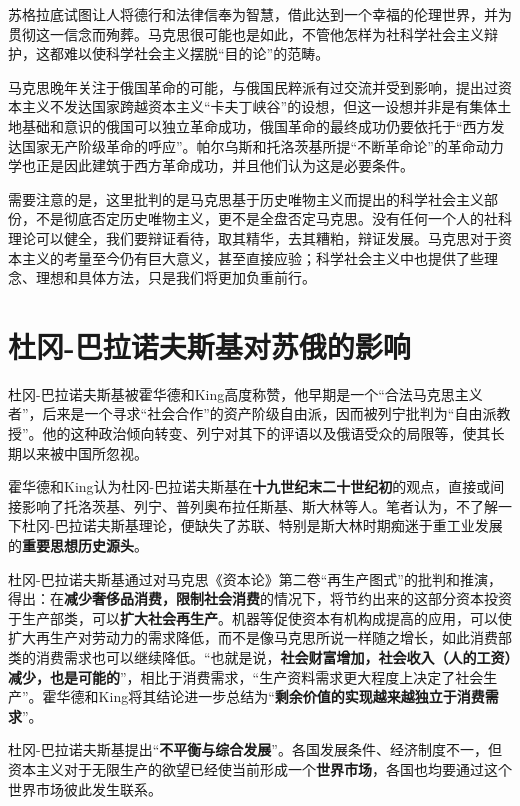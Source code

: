 苏格拉底试图让人将德行和法律信奉为智慧，借此达到一个幸福的伦理世界，并为贯彻这一信念而殉葬。马克思很可能也是如此，不管他怎样为社科学社会主义辩护，这都难以使科学社会主义摆脱“目的论”的范畴。

马克思晚年关注于俄国革命的可能，与俄国民粹派有过交流并受到影响，提出过资本主义不发达国家跨越资本主义“卡夫丁峡谷”的设想，但这一设想并非是有集体土地基础和意识的俄国可以独立革命成功，俄国革命的最终成功仍要依托于“西方发达国家无产阶级革命的呼应”。\cite{mamincui}帕尔乌斯和托洛茨基所提“不断革命论”的革命动力学也正是因此建筑于西方革命成功，并且他们认为这是必要条件。

需要注意的是，这里批判的是马克思基于历史唯物主义而提出的科学社会主义部份，不是彻底否定历史唯物主义，更不是全盘否定马克思。没有任何一个人的社科理论可以健全，我们要辩证看待，取其精华，去其糟粕，辩证发展。马克思对于资本主义的考量至今仍有巨大意义，甚至直接应验；科学社会主义中也提供了些理念、理想和具体方法，只是我们将更加负重前行。

\section{杜冈-巴拉诺夫斯基对苏俄的影响}

杜冈-巴拉诺夫斯基被霍华德和King高度称赞，他早期是一个“合法马克思主义者”，后来是一个寻求“社会合作”的资产阶级自由派，因而被列宁批判为“自由派教授”。他的这种政治倾向转变、列宁对其下的评语以及俄语受众的局限等，使其长期以来被中国所忽视。

霍华德和King认为杜冈-巴拉诺夫斯基在\textbf{十九世纪末二十世纪初}的观点，直接或间接影响了托洛茨基、列宁、普列奥布拉任斯基、斯大林等人。笔者认为，不了解一下杜冈-巴拉诺夫斯基理论，便缺失了苏联、特别是斯大林时期痴迷于重工业发展的\textbf{重要思想历史源头}。

杜冈-巴拉诺夫斯基通过对马克思《资本论》第二卷“再生产图式”的批判和推演，得出：在\textbf{减少奢侈品消费，限制社会消费}的情况下，将节约出来的这部分资本投资于生产部类，可以\textbf{扩大社会再生产}。机器等促使资本有机构成提高的应用，可以使扩大再生产对劳动力的需求降低，而不是像马克思所说一样随之增长，如此消费部类的消费需求也可以继续降低。“也就是说，\textbf{社会财富增加，社会收入（人的工资）减少，也是可能的}”，相比于消费需求，“生产资料需求更大程度上决定了社会生产”。\cite{lijingdugang}霍华德和King将其结论进一步总结为“\textbf{剩余价值的实现越来越独立于消费需求}”。

杜冈-巴拉诺夫斯基提出“\textbf{不平衡与综合发展}”。各国发展条件、经济制度不一，但资本主义对于无限生产的欲望已经使当前形成一个\textbf{世界市场}，各国也均要通过这个世界市场彼此发生联系。

